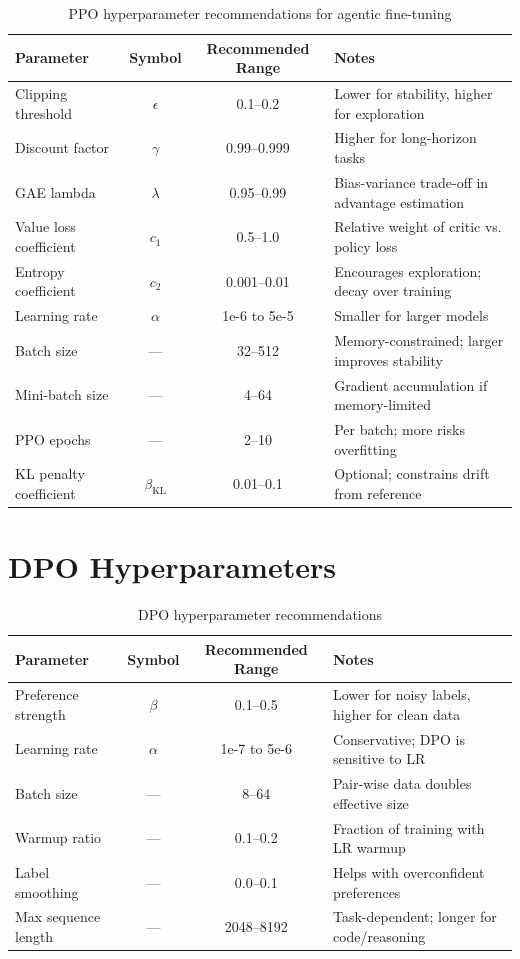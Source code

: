 \documentclass[12pt,a4paper]{report}
\theoremstyle{definition}
\begin{document}
\begin{table}[htbp]
\centering
\caption{PPO hyperparameter recommendations for agentic fine-tuning}
\label{tab:ppo_hyperparams}
\begin{tabular}{@{}lccl@{}}
\toprule
\textbf{Parameter} & \textbf{Symbol} & \textbf{Recommended Range} & \textbf{Notes} \\
\midrule
Clipping threshold & $\epsilon$ & 0.1--0.2 & Lower for stability, higher for exploration \\
Discount factor & $\gamma$ & 0.99--0.999 & Higher for long-horizon tasks \\
GAE lambda & $\lambda$ & 0.95--0.99 & Bias-variance trade-off in advantage estimation \\
Value loss coefficient & $c_1$ & 0.5--1.0 & Relative weight of critic vs. policy loss \\
Entropy coefficient & $c_2$ & 0.001--0.01 & Encourages exploration; decay over training \\
Learning rate & $\alpha$ & 1e-6 to 5e-5 & Smaller for larger models \\
Batch size & --- & 32--512 & Memory-constrained; larger improves stability \\
Mini-batch size & --- & 4--64 & Gradient accumulation if memory-limited \\
PPO epochs & --- & 2--10 & Per batch; more risks overfitting \\
KL penalty coefficient & $\beta_{\text{KL}}$ & 0.01--0.1 & Optional; constrains drift from reference \\
\bottomrule
\end{tabular}
\end{table}

\section{DPO Hyperparameters}

\begin{table}[htbp]
\centering
\caption{DPO hyperparameter recommendations}
\label{tab:dpo_hyperparams}
\begin{tabular}{@{}lccl@{}}
\toprule
\textbf{Parameter} & \textbf{Symbol} & \textbf{Recommended Range} & \textbf{Notes} \\
\midrule
Preference strength & $\beta$ & 0.1--0.5 & Lower for noisy labels, higher for clean data \\
Learning rate & $\alpha$ & 1e-7 to 5e-6 & Conservative; DPO is sensitive to LR \\
Batch size & --- & 8--64 & Pair-wise data doubles effective size \\
Warmup ratio & --- & 0.1--0.2 & Fraction of training with LR warmup \\
Label smoothing & --- & 0.0--0.1 & Helps with overconfident preferences \\
Max sequence length & --- & 2048--8192 & Task-dependent; longer for code/reasoning \\
\bottomrule
\end{tabular}
\end{table}
\end{document}
